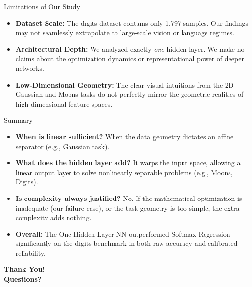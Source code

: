 \documentclass[11pt,aspectratio=169]{beamer}
\begin{document}
\begin{frame}{Limitations of Our Study}
    \begin{itemize}
        \item \textbf{Dataset Scale:} The digits dataset contains only 1,797 samples. Our findings may not seamlessly extrapolate to large-scale vision or language regimes.
        \item \textbf{Architectural Depth:} We analyzed exactly \textit{one} hidden layer. We make no claims about the optimization dynamics or representational power of deeper networks.
        \item \textbf{Low-Dimensional Geometry:} The clear visual intuitions from the 2D Gaussian and Moons tasks do not perfectly mirror the geometric realities of high-dimensional feature spaces.
    \end{itemize}
\end{frame}

\begin{frame}{Summary}
    \begin{itemize}
        \item \textbf{When is linear sufficient?} When the data geometry dictates an affine separator (e.g., Gaussian task).
        \item \textbf{What does the hidden layer add?} It warps the input space, allowing a linear output layer to solve nonlinearly separable problems (e.g., Moons, Digits).
        \item \textbf{Is complexity always justified?} No. If the mathematical optimization is inadequate (our failure case), or the task geometry is too simple, the extra complexity adds nothing.
        \item \textbf{Overall:} The One-Hidden-Layer NN outperformed Softmax Regression significantly on the digits benchmark in both raw accuracy and calibrated reliability.
    \end{itemize}
    
    \vspace{1em}
    \begin{center}
        \textbf{Thank You! \\ Questions?}
    \end{center}
\end{frame}
\end{document}
